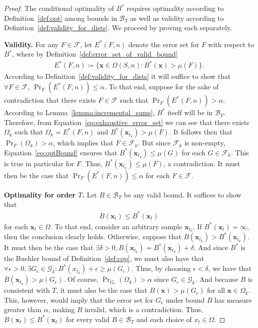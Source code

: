 \documentclass{article}
\theoremstyle{definition}
\theoremstyle{remark}
\newcommand{\argmin}{\mathop{\rm argmin}}
\def\x{\mathbf{x}}
\begin{document}
\begin{proof}
The conditional optimality of $B^*$ requires optimality according to Definition~\ref{def:opt} among bounds in $\mathcal{B}_T$ as well as validity according to Definition~\ref{def:validity_for_dists}. We proceed by proving each separately.

{\bf Validity.} 
For any $F \in \mathcal{F}$, let $E^*(F, n)$ denote the error set for $F$ with respect to $B^*$, where by Definition~\ref{def:error_set_of_valid_bound}
\begin{eqnarray}
\label{eq:exhaustive_error_set}
    E^*(F,n) \coloneqq \{\x\in \Omega(S,n): B^*(\x) > \mu(F)\}.    
\end{eqnarray}
According to Definition~\ref{def:validity_for_dists} it will suffice to show that $\forall F \in \mathcal{F}$, $\Pr_F(E^*(F, n)) \leq \alpha$. 
To that end, suppose for the sake of contradiction that there exists $F \in \mathcal{F}$ such that $\Pr_F(E^*(F, n)) > \alpha$.
According to Lemma~\ref{lemma:incremental_sums}, $B^*$ itself will be in $\mathcal{B}_T$.
Therefore, from Equation~\ref{eq:exhaustive_error_set} we can see that there exists $\Omega_k$ such that $\Omega_k = E^*(F, n)$ and $B^*(\x_{t_k}) > \mu(F)$.
It follows then that $\Pr_F(\Omega_k) > \alpha$, which implies that $F \in \mathcal{F}_k$.
But since $\mathcal{F}_k$ is non-empty, Equation~\ref{eq:optBound} ensures that $B^*(\x_{t_k}) \leq \mu(G)$ for each $G \in \mathcal{F}_k$.
This is true in particular for $F$.
Thus, $B^*(\x_{t_k}) \leq \mu(F)$, a contradiction.
It must then be the case that $\Pr_F(E^*(F, n)) \leq \alpha$ for each $F \in \mathcal{F}$.
\color{black}
\medskip

{\bf Optimality for order $T$.}
Let $B \in \mathcal{B}_T$ be any valid bound. It suffices to show that 
\begin{eqnarray}
    B(\x_t) \leq B^*(\x_t)
\end{eqnarray}
for each $\x_t \in \Omega$. To that end, consider an arbitrary sample $\x_{t_k}$. If $B^*(\x_t) = \infty$, then the conclusion clearly holds. Otherwise, suppose that $B(\x_{t_k}) > B^*(\x_{t_k})$. It must then be the case that $\exists \delta > 0, B(\x_{t_k}) = B^*(\x_{t_k}) + \delta$.
And since $B^*$ is the Buehler bound of Definition~\ref{def:cop}, we must also have that $\forall \epsilon > 0, \exists G_\epsilon \in \mathcal{G}_k: B^*(x_{t_k}) + \epsilon \geq \mu(G_\epsilon)$.
Thus, by choosing $\epsilon < \delta$, we have that $B(\x_{t_k}) > \mu(G_\epsilon)$.
Of course, $\Pr_{G_\epsilon}(\Omega_k) > \alpha$ since $G_\epsilon \in \mathcal{G}_k$.
And because $B$ is consistent with $T$, it must also be the case that $B(\x) > \mu(G_\epsilon)$ for all $\x \in \Omega_k$.
This, however, would imply that the error set for $G_\epsilon$ under bound $B$ has measure greater than $\alpha$, making $B$ invalid, which is a contradiction. Thus, $B(\x_t) \leq B^*(\x_t)$ for every valid $B \in \mathcal{B}_T$ and each choice of $x_t \in \Omega$. 
\color{black}


\end{proof}
\end{document}
